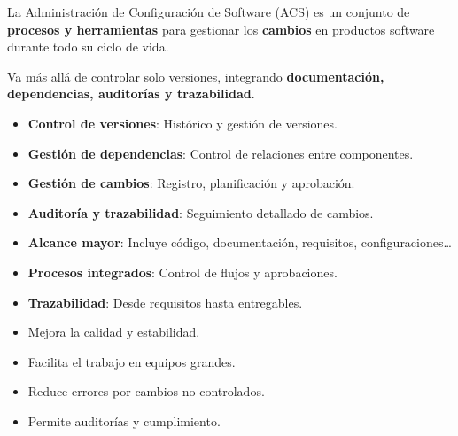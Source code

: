 \begin{multicols}{2}

    \begin{cajaazul}
        La Administración de Configuración de Software (ACS) es un conjunto de \textbf{procesos y herramientas} para gestionar los \textbf{cambios} en productos software durante todo su ciclo de vida.

        Va más allá de controlar solo versiones, integrando \textbf{documentación, dependencias, auditorías y trazabilidad}.
    \end{cajaazul}

    \vspace{0.5em}

    \begin{cajaverde}
        \begin{itemize}[leftmargin=*]
            \item \textbf{Control de versiones}: Histórico y gestión de versiones.
            \item \textbf{Gestión de dependencias}: Control de relaciones entre componentes.
            \item \textbf{Gestión de cambios}: Registro, planificación y aprobación.
            \item \textbf{Auditoría y trazabilidad}: Seguimiento detallado de cambios.
        \end{itemize}
    \end{cajaverde}

    \vspace{0.5em}
    \deactivatequoting
    \begin{cajanaranja}
        \begin{itemize}[leftmargin=*]
            \item \textbf{Alcance mayor}: Incluye código, documentación, requisitos, configuraciones\ldots
            \item \textbf{Procesos integrados}: Control de flujos y aprobaciones.
            \item \textbf{Trazabilidad}: Desde requisitos hasta entregables.
        \end{itemize}
    \end{cajanaranja}
    \activatequoting
    \vspace{0.5em}

    \begin{cajarosa}[Beneficios]
        \begin{itemize}[leftmargin=*]
            \item Mejora la calidad y estabilidad.
            \item Facilita el trabajo en equipos grandes.
            \item Reduce errores por cambios no controlados.
            \item Permite auditorías y cumplimiento.
        \end{itemize}
    \end{cajarosa}


\end{multicols}
